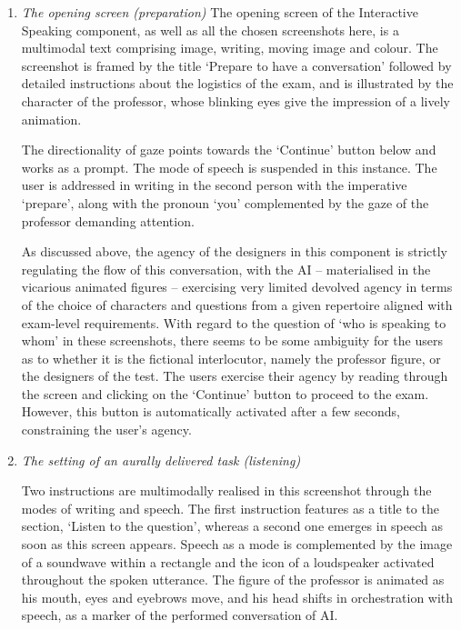 \documentclass[english]{textolivre}
\begin{document}
\begin{enumerate}[label=\alph*.]

    \item \textit{The opening screen (preparation)}
The opening screen of the Interactive Speaking component, as well as all the chosen screenshots here, is a multimodal text comprising image, writing, moving image and colour. The screenshot is framed by the title ‘Prepare to have a conversation’ followed by detailed instructions about the logistics of the exam, and is illustrated by the character of the professor, whose blinking eyes give the impression of a lively animation.

The directionality of gaze points towards the ‘Continue’ button below and works as a prompt. The mode of speech is suspended in this instance. The user is addressed in writing in the second person with the imperative ‘prepare’, along with the pronoun ‘you’ complemented by the gaze of the professor demanding attention.

As discussed above, the agency of the designers in this component is strictly regulating the flow of this conversation, with the AI – materialised in the vicarious animated figures – exercising very limited devolved agency in terms of the choice of characters and questions from a given repertoire aligned with exam-level requirements. With regard to the question of ‘who is speaking to whom’ in these screenshots, there seems to be some ambiguity for the users as to whether it is the fictional interlocutor, namely the professor figure, or the designers of the test. The users exercise their agency by reading through the screen and clicking on the ‘Continue’ button to proceed to the exam. However, this button is automatically activated after a few seconds, constraining the user’s agency.

    \item \textit{The setting of an aurally delivered task (listening)}

Two instructions are multimodally realised in this screenshot through the modes of writing and speech. The first instruction features as a title to the section, ‘Listen to the question’, whereas a second one emerges in speech as soon as this screen appears. Speech as a mode is complemented by the image of a soundwave within a rectangle and the icon of a loudspeaker activated throughout the spoken utterance. The figure of the professor is animated as his mouth, eyes and eyebrows move, and his head shifts in orchestration with speech, as a marker of the performed conversation of AI.


\end{enumerate}
\end{document}
